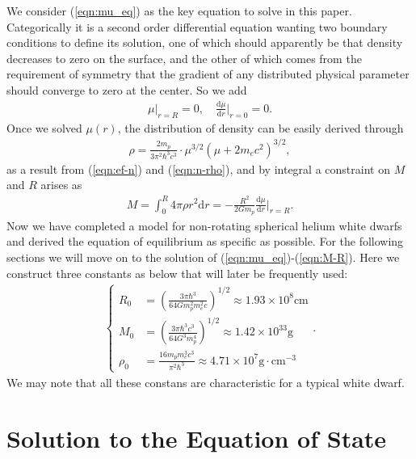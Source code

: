 \documentclass[a4paper,11pt]{article}
\newcommand{\mathdd}{\mathrm{d}}
\numberwithin{equation}{section}
\numberwithin{table}{section}
\numberwithin{figure}{section}
\begin{document}
			We consider (\ref{eqn:mu_eq}) as the key equation to solve in this paper. Categorically it is a second order differential equation wanting two boundary conditions to define its solution, one of which should apparently be that density decreases to zero on the surface, and the other of which comes from the requirement of symmetry that the gradient of any distributed physical parameter should converge to zero at the center. So we add
			\begin{align}
				\mu\bigg|_{r=R}=0,\quad
				\frac{\mathdd\mu}{\mathdd r}\bigg|_{r=0}=0.
				\label{eqn:mu_bd}
			\end{align}
			Once we solved $\mu(r)$, the distribution of density can be easily derived through
			\begin{align}
				\rho=\frac{2m_p}{3\pi^2\hbar^3c^3}\cdot
					\mu^{3/2}(\mu+2m_ec^2)^{3/2},
				\label{eqn:rho-r}
			\end{align}
			as a result from (\ref{eqn:ef-n}) and (\ref{eqn:n-rho}), and by integral a constraint on $M$ and $R$ arises as
			\begin{align}
				M=\int_0^R\!\!4\pi\rho r^2\mathdd r
					=-\frac{R^2}{2Gm_p}\frac{\mathdd\mu}{\mathdd r}\bigg|_{r=R}.
				\label{eqn:M-R}
			\end{align}
			Now we have completed a model for non-rotating spherical helium white dwarfs and derived the equation of equilibrium as specific as possible. For the following sections we will move on to the solution of (\ref{eqn:mu_eq})-(\ref{eqn:M-R}). Here we construct three constants as below that will later be frequently used:
			\begin{align}
				\left\{\begin{aligned}
					R_0&=\left(\frac{3\pi\hbar^3}{64Gm_p^2m_e^2c}\right)^{1/2}
						\approx 1.93\times 10^8\mathrm{cm} \\
					M_0&=\left(\frac{3\pi\hbar^3c^3}{64G^3m_p^4}\right)^{1/2}
						\approx 1.42\times 10^{33}\mathrm{g} \\
					\rho_0&=\frac{16m_pm_e^3c^3}{\pi^2\hbar^3}
						\approx 4.71\times 10^7\mathrm{g\cdot cm^{-3}}
				\end{aligned}\right. .
				\label{eqn:consts}
			\end{align}
			We may note that all these constans are characteristic for a typical white dwarf.
	
	
	\section{Solution to the Equation of State}
	
\end{document}
